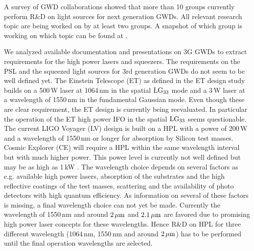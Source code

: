 

A survey of GWD collaborations showed that more than 10 groups currently perform R\&D on light sources for next generation GWDs. All relevant research topic are being worked on by at least two groups. A snapshot of which group is working on which topic can be found at \cite{LightSource_RD_table}. 


We analyzed available documentation and presentations on 3G GWDs to extract requirements for the high power lasers and squeezers. 
The requirements on the PSL and the squeezed light sources for 3rd generation GWDs do not seem to be well defined yet. The Einstein Telescope (ET) as defined in the ET design study builds on a 500\,W laser at 1064\,nm in the spatial $\rm LG_{33}$ mode and a 3\,W laser at a wavelength of 1550\,nm in the fundamental Gaussian mode. Even though these are clear requirement, the ET design is currently being reevaluated. In particular the operation of the ET high power IFO in the spatial $\rm LG_{33}$ seems questionable. The current  LIGO Voyager (LV) design is built on a HPL with a power of 200\,W and a wavelength of 1550\,nm or longer for absorption by Silicon test masses. Cosmic Explorer (CE) will require a HPL within the same wavelength interval but with much higher power. This power level is currently not well defined but may be as high as 1\,kW \cite{GWADW2018,ISWP:2018}. The wavelength choice depends on several factors as e.g. available high power lasers, absorption of the substrates and the high reflective coatings of the test masses, scattering and the availability of photo detectors with high quantum efficiency. As information on several of these factors is missing, a final wavelength choice can not yet be made. Currently the wavelength of 1550\,nm and around $\rm 2\, \mu m $ and $\rm 2.1\, \mu m $ are favored due to promising high power laser concepts for these wavelengths. Hence R\&D on HPL for three different wavelength (1064\,nm, 1550\,nm and around $\rm 2\, \mu m $) has to be performed until the final operation wavelengths are selected. 

